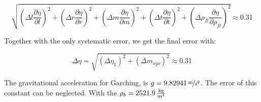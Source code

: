 \begin{equation}
\sqrt{
\left(\Delta l\frac{\partial \eta}{\partial l}\right)^2
+
\left(\Delta r\frac{\partial \eta}{\partial r}\right)^2
+
\left(\Delta m\frac{\partial \eta}{\partial m}\right)^2
+
\left(\Delta t\frac{\partial \eta}{\partial t}\right)^2
+
\left(\Delta \rho_{fl}\frac{\partial \eta}{\partial \rho_{fl}}\right)^2
} \approx 0.31
\end{equation}

Together with the only systematic error, we get the final error with:

\begin{equation}
\Delta \eta = \sqrt{\left(\Delta \eta_1\right)^2 + \left(\Delta m_{sys}\right)^2} \approx 0.31
\end{equation}

The gravitational acceleration for Garching, is $g = \unitfrac[9.82941]{m}{s^2}$. The error of this constant can be neglected. With the $\rho_b = \unit[2521.9]{\frac{kg}{m^3}}$



